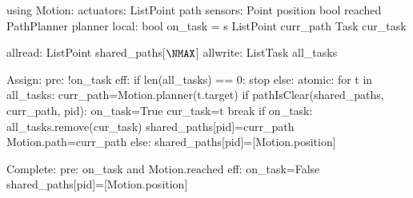 using Motion:
  actuators:
    List\<Point\> path
  sensors:
    Point position
    bool reached
    PathPlanner planner
local:
  bool on_task = s
  List\<Point\> curr_path
  Task cur_task

allread:
  List\<Point\> shared_paths[$\NMAX$]
allwrite:
  List\<Task\> all_tasks

Assign:
  pre: !on_task
  eff:
     if len(all_tasks) == 0:
        stop
     else: atomic:
        for t in all_tasks:
           curr_path=Motion.planner(t.target)
           if pathIsClear(shared_paths, curr_path, pid):
              on_task=True
              cur_task=t
              break
        if on_task:
           all_tasks.remove(cur_task)
           shared_paths[pid]=curr_path
           Motion.path=curr_path
        else:
           shared_paths[pid]=[Motion.position]

Complete:
    pre: on_task and Motion.reached
    eff: on_task=False
         shared_paths[pid]=[Motion.position]
